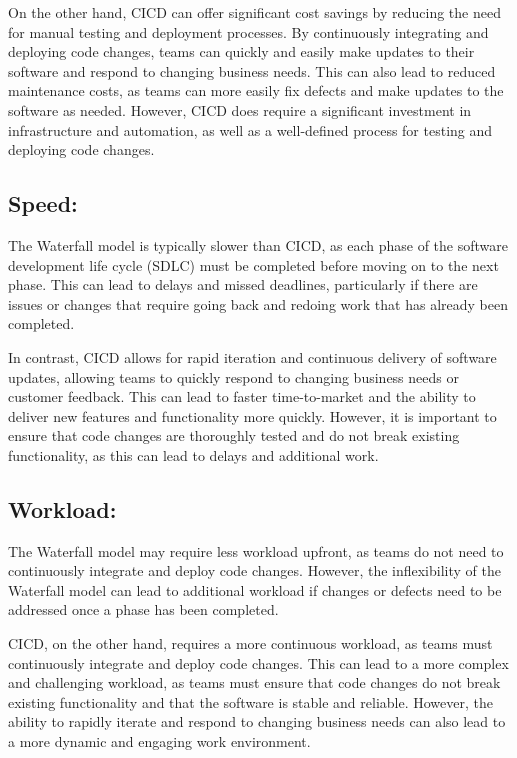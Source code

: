 \documentclass[
  10pt,
  paper=a4,
  ,captions=tableheading
]{scrartcl}
\begin{document}
On the other hand, CICD can offer significant cost savings by reducing
the need for manual testing and deployment processes. By continuously
integrating and deploying code changes, teams can quickly and easily
make updates to their software and respond to changing business needs.
This can also lead to reduced maintenance costs, as teams can more
easily fix defects and make updates to the software as needed. However,
CICD does require a significant investment in infrastructure and
automation, as well as a well-defined process for testing and deploying
code changes.

\hypertarget{speed}{%
\subsection{Speed:}\label{speed}}

The Waterfall model is typically slower than CICD, as each phase of the
software development life cycle (SDLC) must be completed before moving
on to the next phase. This can lead to delays and missed deadlines,
particularly if there are issues or changes that require going back and
redoing work that has already been completed.

In contrast, CICD allows for rapid iteration and continuous delivery of
software updates, allowing teams to quickly respond to changing business
needs or customer feedback. This can lead to faster time-to-market and
the ability to deliver new features and functionality more quickly.
However, it is important to ensure that code changes are thoroughly
tested and do not break existing functionality, as this can lead to
delays and additional work.

\hypertarget{workload}{%
\subsection{Workload:}\label{workload}}

The Waterfall model may require less workload upfront, as teams do not
need to continuously integrate and deploy code changes. However, the
inflexibility of the Waterfall model can lead to additional workload if
changes or defects need to be addressed once a phase has been completed.

CICD, on the other hand, requires a more continuous workload, as teams
must continuously integrate and deploy code changes. This can lead to a
more complex and challenging workload, as teams must ensure that code
changes do not break existing functionality and that the software is
stable and reliable. However, the ability to rapidly iterate and respond
to changing business needs can also lead to a more dynamic and engaging
work environment.
\end{document}
